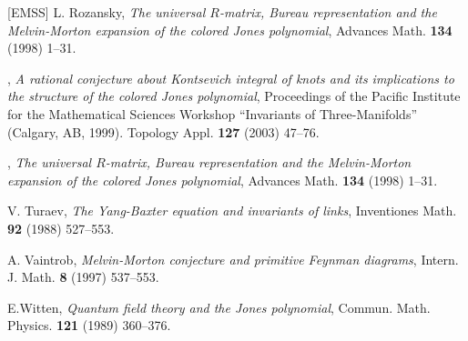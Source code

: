 \documentclass{amsart}
\theoremstyle{plain}
\theoremstyle{definition}
\theoremstyle{remark}
\begin{document}
\begin{thebibliography}{[EMSS]}
 L. Rozansky,
        {\em The universal $R$-matrix, Bureau representation and the 
        Melvin-Morton expansion of the colored Jones polynomial},
        Advances Math. {\bf 134} (1998) 1--31.

 \bysame,
        {\em A rational conjecture about Kontsevich integral of knots and its
        implications to the structure of the colored Jones polynomial},
        Proceedings of the Pacific Institute for the Mathematical Sciences 
        Workshop ``Invariants of Three-Manifolds'' (Calgary, AB, 1999).
        Topology Appl. {\bf 127} (2003) 47--76.

 \bysame,
        {\em The universal $R$-matrix, Bureau representation and the 
        Melvin-Morton expansion of the colored Jones polynomial},
        Advances Math. {\bf 134} (1998) 1--31.

 V. Turaev,
        {\em The Yang-Baxter equation and invariants of links},
        Inventiones Math. {\bf 92} (1988) 527--553.

 A. Vaintrob,
        {\em Melvin-Morton conjecture and primitive Feynman diagrams},
        Intern. J. Math. {\bf 8} (1997) 537--553.

 E.Witten, 
        {\em Quantum field theory and the Jones polynomial}, 
        Commun. Math. Physics. {\bf 121} (1989) 360--376.

\end{thebibliography}
\end{document}
